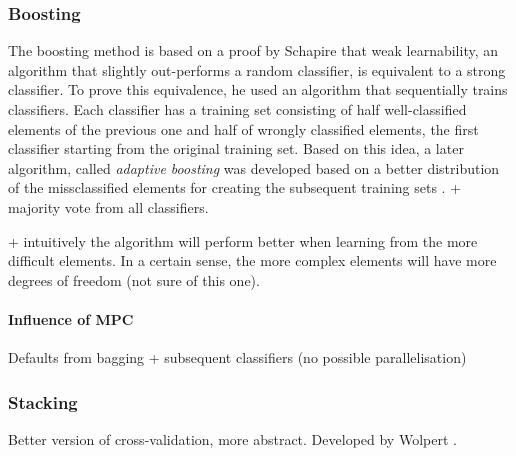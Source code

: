 \subsubsection{Boosting}
The boosting method is based on a proof by Schapire \cite{Schapire1989} that weak learnability, an algorithm that slightly out-performs a random classifier, is equivalent to a strong classifier. To prove this equivalence, he used an algorithm that sequentially trains classifiers. Each classifier has a training set consisting of half well-classified elements of the previous one and half of wrongly classified elements, the first classifier starting from the original training set. Based on this idea, a later algorithm, called \emph{adaptive boosting} was developed based on a better distribution of the missclassified elements for creating the subsequent training sets \cite{Freund1997ABoosting}. + majority vote from all classifiers.

+ intuitively the algorithm will perform better when learning from the more difficult elements. In a certain sense, the more complex elements will have more degrees of freedom (not sure of this one).

\paragraph{Influence of MPC}
Defaults from bagging + subsequent classifiers (no possible parallelisation)

\subsubsection{Stacking}
Better version of cross-validation, more abstract. Developed by Wolpert \cite{Wolpert1992StackedGeneralization}.
